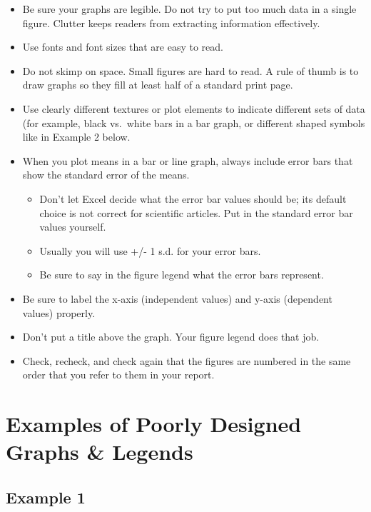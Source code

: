 \documentclass[
]{book}
\providecommand{\tightlist}{%
  \setlength{\itemsep}{0pt}\setlength{\parskip}{0pt}}
\begin{document}
\begin{itemize}
\tightlist
\item
  Be sure your graphs are legible. Do not try to put too much data in a single figure. Clutter keeps readers from extracting information effectively.
\item
  Use fonts and font sizes that are easy to read.
\item
  Do not skimp on space. Small figures are hard to read. A rule of thumb is to draw graphs so they fill at least half of a standard print page.
\item
  Use clearly different textures or plot elements to indicate different sets of data (for example, black vs.~white bars in a bar graph, or different shaped symbols like in Example 2 below.
\item
  When you plot means in a bar or line graph, always include error bars that show the standard error of the means.

  \begin{itemize}
  \tightlist
  \item
    Don't let Excel decide what the error bar values should be; its default choice is not correct for scientific articles. Put in the standard error bar values yourself.
  \item
    Usually you will use +/- 1 s.d. for your error bars.
  \item
    Be sure to say in the figure legend what the error bars represent.\\
  \end{itemize}
\item
  Be sure to label the x-axis (independent values) and y-axis (dependent values) properly.
\item
  Don't put a title above the graph. Your figure legend does that job.
\item
  Check, recheck, and check again that the figures are numbered in the same order that you refer to them in your report.
\end{itemize}

\hypertarget{examples-of-poorly-designed-graphs-legends}{%
\section{Examples of Poorly Designed Graphs \& Legends}\label{examples-of-poorly-designed-graphs-legends}}

\hypertarget{example-1-10}{%
\subsection{Example 1}\label{example-1-10}}
\end{document}
